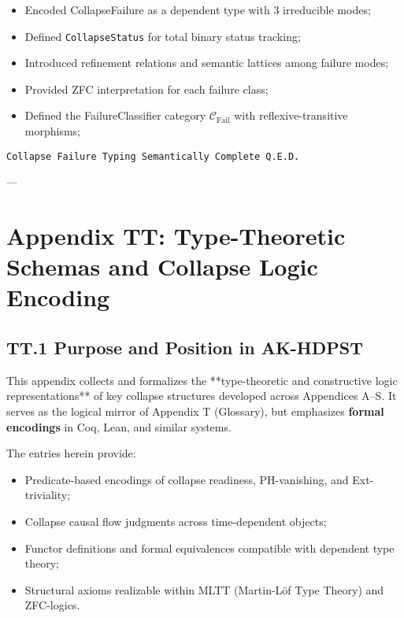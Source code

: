\documentclass[11pt]{article}
\begin{document}
\begin{itemize}
  \item Encoded CollapseFailure as a dependent type with 3 irreducible modes;
  \item Defined \texttt{CollapseStatus} for total binary status tracking;
  \item Introduced refinement relations and semantic lattices among failure modes;
  \item Provided ZFC interpretation for each failure class;
  \item Defined the FailureClassifier category \(\mathcal{C}_{\text{Fail}}\) with reflexive-transitive morphisms;
\end{itemize}

\begin{flushright}
\texttt{Collapse Failure Typing \quad Semantically Complete \quad Q.E.D.}
\end{flushright}

---

\section*{Appendix TT: Type-Theoretic Schemas and Collapse Logic Encoding}

\subsection*{TT.1 Purpose and Position in AK-HDPST}

This appendix collects and formalizes the **type-theoretic and constructive logic representations**  
of key collapse structures developed across Appendices A–S. It serves as the logical mirror of Appendix T (Glossary),  
but emphasizes \textbf{formal encodings} in Coq, Lean, and similar systems.

The entries herein provide:

\begin{itemize}
  \item Predicate-based encodings of collapse readiness, PH-vanishing, and Ext-triviality;
  \item Collapse causal flow judgments across time-dependent objects;
  \item Functor definitions and formal equivalences compatible with dependent type theory;
  \item Structural axioms realizable within MLTT (Martin-Löf Type Theory) and ZFC-logics.
\end{itemize}
\end{document}
